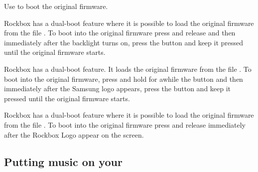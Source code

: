 {  
    {
    Use \ButtonPower{} to boot the original \playerman{} firmware.
    }

    {
    Rockbox has a dual-boot feature where it is possible to load the original firmware from
    the file . To boot into the original firmware press and release
    \ButtonPower{} and then immediately after the backlight turns on, press the \ButtonOK{}
    button and keep it pressed until the original firmware starts.
    }

    {
    Rockbox has a dual-boot feature. It loads the original firmware from
    the file . To boot into the original firmware, press and hold
    for awhile the \ButtonPlay{} button and then immediately after the Samsung logo appears,
    press the \ButtonLeft{} button and keep it pressed until the original firmware starts.
    }

    {
    Rockbox has a dual-boot feature where it is possible to load the original firmware from
    the file . To boot into the original firmware press and release
    \ButtonPower{} immediately after the Rockbox Logo appear on the screen.
    }

  }
\subsection{Putting music on your \dap{}}


